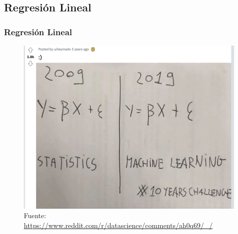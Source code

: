 \documentclass[
  shownotes,
  xcolor={svgnames},
  hyperref={colorlinks,citecolor=DarkBlue,linkcolor=DarkRed,urlcolor=DarkBlue}
  , aspectratio=169]{beamer}
\begin{document}
\subsection{Regresión Lineal}
 \begin{frame}[noframenumbering]
\tableofcontents[currentsubsection]

\end{frame}
\begin{frame}
\frametitle{Regresión Lineal}

\begin{figure}[H] \centering
  \centering
  \includegraphics[scale=0.25]{figures/ten_years.png}
  \\
  \tiny
  Fuente: \url{https://www.reddit.com/r/datascience/comments/ah0q69/_/}
\end{figure}

\end{frame}
\end{document}
